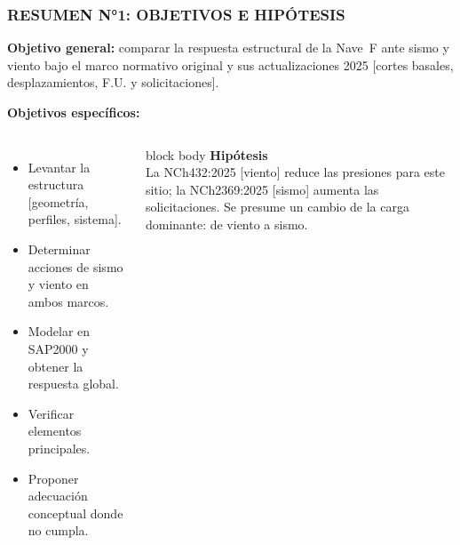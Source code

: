 ﻿\documentclass[11.5pt,aspectratio=169,handout]{beamer}
\newcommand{\ctitle}[1]{\frametitle{#1}}
\begin{document}
\begin{frame}
\ctitle{RESUMEN N°1: OBJETIVOS E HIPÓTESIS}
\vspace{-1mm}
{\footnotesize\textbf{Objetivo general:} comparar la respuesta estructural de la Nave~F ante sismo y viento
bajo el marco normativo original y sus actualizaciones 2025 [cortes basales,
desplazamientos, F.U. y solicitaciones].}

\vspace{2mm}
{\footnotesize\textbf{Objetivos específicos:}}\\[1mm]
\begin{columns}[T,totalwidth=\textwidth]
  \begin{itemize}\footnotesize\setlength{\itemsep}{1.5mm}
    \item \alert{Levantar} la estructura [geometría, perfiles,
          sistema].
    \item \alert{Determinar} acciones de sismo y viento en
          ambos marcos.
    \item \alert{Modelar} en SAP2000 y obtener la respuesta
          global.
    \item \alert{Verificar} elementos principales.
    \item \alert{Proponer} adecuación conceptual donde no
          cumpla.
  \end{itemize}
  \vspace{2mm}
  \begin{beamercolorbox}[rounded=true,shadow=true,sep=3mm]{block body}
  {\footnotesize\textbf{Hipótesis}}\\[1mm]
  {\footnotesize La \alert{NCh432:2025} [viento] \alert{reduce} las presiones
  para este sitio; la \alert{NCh2369:2025} [sismo]
  \alert{aumenta} las solicitaciones. Se presume un
  \alert{cambio de la carga dominante}: de viento a
  sismo.}
  \end{beamercolorbox}
\end{columns}
\end{frame}
\end{document}

